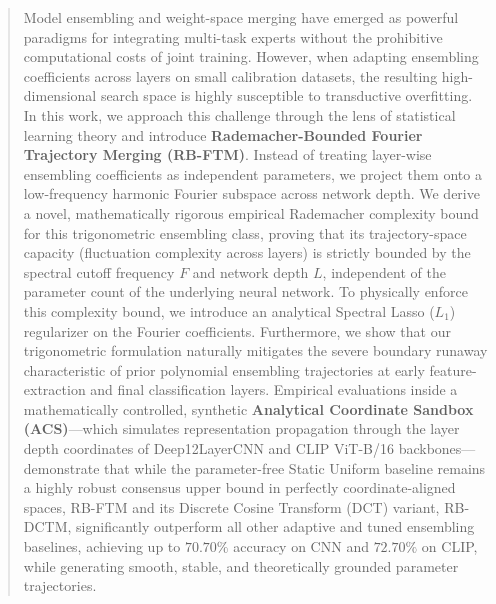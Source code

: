 \begin{abstract}
Model ensembling and weight-space merging have emerged as powerful paradigms for
integrating multi-task experts without the prohibitive computational costs of
joint training. However, when adapting ensembling coefficients across layers on
small calibration datasets, the resulting high-dimensional search space is
highly susceptible to transductive overfitting. In this work, we approach this
challenge through the lens of statistical learning theory and introduce
\textbf{Rademacher-Bounded Fourier Trajectory Merging (RB-FTM)}. Instead of
treating layer-wise ensembling coefficients as independent parameters, we
project them onto a low-frequency harmonic Fourier subspace across network
depth. We derive a novel, mathematically rigorous empirical Rademacher
complexity bound for this trigonometric ensembling class, proving that its
trajectory-space capacity (fluctuation complexity across layers) is strictly
bounded by the spectral cutoff frequency $F$ and network depth $L$, independent
of the parameter count of the underlying neural network. To physically enforce
this complexity bound, we introduce an analytical Spectral Lasso ($L_1$)
regularizer on the Fourier coefficients. Furthermore, we show that our
trigonometric formulation naturally mitigates the severe boundary runaway
characteristic of prior polynomial ensembling trajectories at early feature-
extraction and final classification layers. Empirical evaluations inside a
mathematically controlled, synthetic \textbf{Analytical Coordinate Sandbox
(ACS)}—which simulates representation propagation through the layer depth
coordinates of Deep12LayerCNN and CLIP ViT-B/16 backbones—demonstrate that while
the parameter-free Static Uniform baseline remains a highly robust consensus
upper bound in perfectly coordinate-aligned spaces, RB-FTM and its Discrete
Cosine Transform (DCT) variant, RB-DCTM, significantly outperform all other
adaptive and tuned ensembling baselines, achieving up to $70.70\%$ accuracy on
CNN and $72.70\%$ on CLIP, while generating smooth, stable, and theoretically
grounded parameter trajectories.
\end{abstract}
